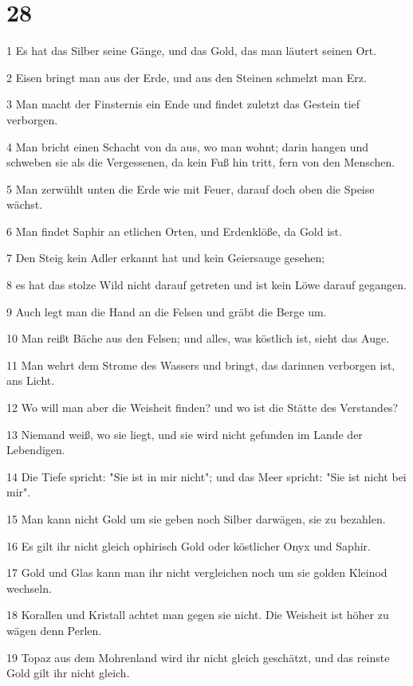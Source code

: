\chapter{28}

\par 1 Es hat das Silber seine Gänge, und das Gold, das man läutert seinen Ort.
\par 2 Eisen bringt man aus der Erde, und aus den Steinen schmelzt man Erz.
\par 3 Man macht der Finsternis ein Ende und findet zuletzt das Gestein tief verborgen.
\par 4 Man bricht einen Schacht von da aus, wo man wohnt; darin hangen und schweben sie als die Vergessenen, da kein Fuß hin tritt, fern von den Menschen.
\par 5 Man zerwühlt unten die Erde wie mit Feuer, darauf doch oben die Speise wächst.
\par 6 Man findet Saphir an etlichen Orten, und Erdenklöße, da Gold ist.
\par 7 Den Steig kein Adler erkannt hat und kein Geiersauge gesehen;
\par 8 es hat das stolze Wild nicht darauf getreten und ist kein Löwe darauf gegangen.
\par 9 Auch legt man die Hand an die Felsen und gräbt die Berge um.
\par 10 Man reißt Bäche aus den Felsen; und alles, was köstlich ist, sieht das Auge.
\par 11 Man wehrt dem Strome des Wassers und bringt, das darinnen verborgen ist, ans Licht.
\par 12 Wo will man aber die Weisheit finden? und wo ist die Stätte des Verstandes?
\par 13 Niemand weiß, wo sie liegt, und sie wird nicht gefunden im Lande der Lebendigen.
\par 14 Die Tiefe spricht: "Sie ist in mir nicht"; und das Meer spricht: "Sie ist nicht bei mir".
\par 15 Man kann nicht Gold um sie geben noch Silber darwägen, sie zu bezahlen.
\par 16 Es gilt ihr nicht gleich ophirisch Gold oder köstlicher Onyx und Saphir.
\par 17 Gold und Glas kann man ihr nicht vergleichen noch um sie golden Kleinod wechseln.
\par 18 Korallen und Kristall achtet man gegen sie nicht. Die Weisheit ist höher zu wägen denn Perlen.
\par 19 Topaz aus dem Mohrenland wird ihr nicht gleich geschätzt, und das reinste Gold gilt ihr nicht gleich.
